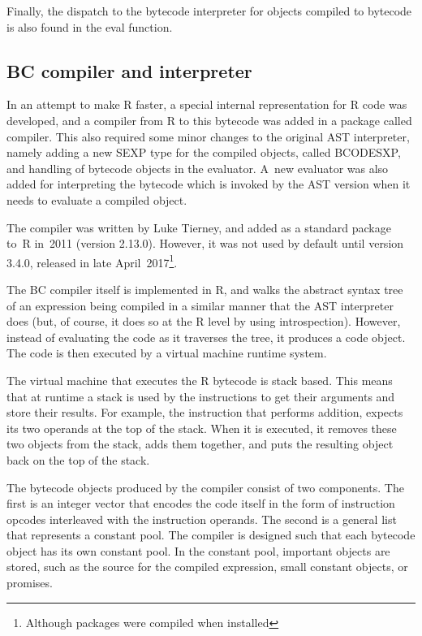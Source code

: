 {Finally, the dispatch to the bytecode interpreter for objects compiled to bytecode is also found in the eval function.


\subsection{BC compiler and interpreter}

In an attempt to make R faster, a special internal representation for R code was developed, and a compiler from R to this bytecode was added in a package called \todo[verb]compiler. This also required some minor changes to the original AST interpreter, namely adding a new SEXP type for the compiled objects, called BCODESXP, and handling of bytecode objects in the evaluator. A~new evaluator was also added for interpreting the bytecode which is invoked by the AST version when it needs to evaluate a compiled object.

The compiler was written by Luke Tierney, and added as a standard package to~R in~2011 (version 2.13.0). However, it was not used by default until version 3.4.0, released in late April~2017\footnote{Although packages were compiled when installed}.

The BC compiler itself is implemented in R, and walks the abstract syntax tree of an expression being compiled in a similar manner that the AST interpreter does (but, of course, it does so at the R level by using introspection). However, instead of evaluating the code as it traverses the tree, it produces a code object. The code is then executed by a virtual machine runtime system.

The virtual machine that executes the R bytecode is stack based. This means that at runtime a stack is used by the instructions to get their arguments and store their results. For example, the instruction that performs addition, expects its two operands at the top of the stack. When it is executed, it removes these two objects from the stack, adds them together, and puts the resulting object back on the top of the stack.

The bytecode objects produced by the compiler consist of two components. The first is an integer vector that encodes the code itself in the form of instruction opcodes interleaved with the instruction operands. The second is a general list that represents a constant pool. The compiler is designed such that each bytecode object has its own constant pool. In the constant pool, important objects are stored, such as the source for the compiled expression, small constant objects, or promises.

}

